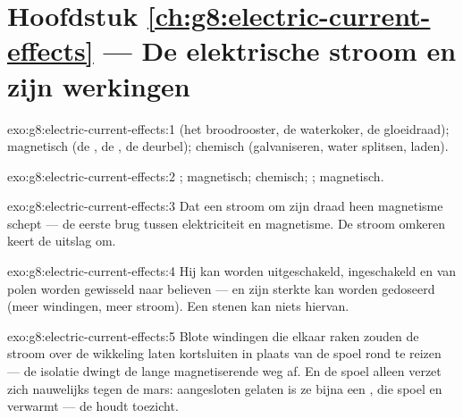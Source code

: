 \section*{Hoofdstuk \ref{ch:g8:electric-current-effects} --- De elektrische stroom en zijn werkingen}

\begin{solution}{exo:g8:electric-current-effects:1}
 (het broodrooster, de waterkoker, de gloeidraad); magnetisch (de
, de , de deurbel); chemisch
(galvaniseren, water splitsen,  laden).
\end{solution}

\begin{solution}{exo:g8:electric-current-effects:2}
; magnetisch; chemisch; ; magnetisch.
\end{solution}

\begin{solution}{exo:g8:electric-current-effects:3}
Dat een stroom om zijn draad heen magnetisme schept --- de eerste brug
tussen elektriciteit en magnetisme. De stroom omkeren keert de uitslag
om.
\end{solution}

\begin{solution}{exo:g8:electric-current-effects:4}
Hij kan worden uitgeschakeld, ingeschakeld en van polen worden gewisseld
naar believen --- en zijn sterkte kan worden gedoseerd (meer windingen,
meer stroom). Een stenen  kan niets hiervan.
\end{solution}

\begin{solution}{exo:g8:electric-current-effects:5}
Blote windingen die elkaar raken zouden de stroom over de wikkeling
laten kortsluiten in plaats van de spoel rond te reizen --- de isolatie
dwingt de lange magnetiserende weg af. En de spoel alleen
verzet zich nauwelijks tegen de mars: aangesloten gelaten is ze bijna
een , die spoel en  verwarmt --- de
 houdt toezicht.
\end{solution}

